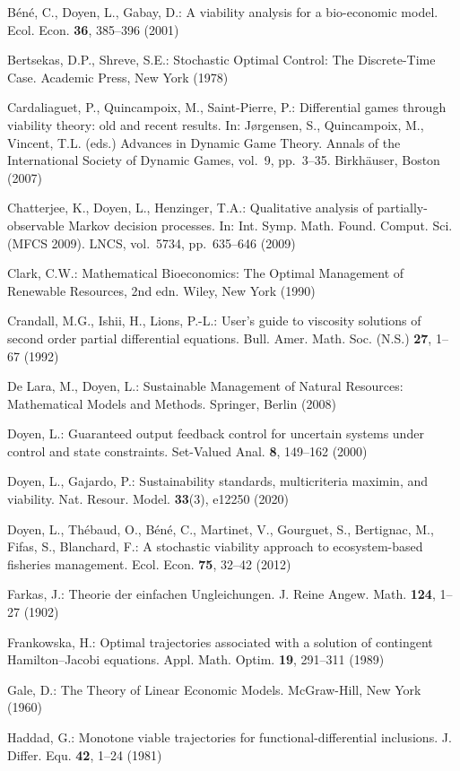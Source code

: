 \documentclass[10pt,twocolumn]{article}
\theoremstyle{definition}
\begin{document}
{B\'en\'e, C., Doyen, L., Gabay, D.: A viability analysis for a bio-economic
model. Ecol. Econ. \textbf{36}, 385--396 (2001)

Bertsekas, D.P., Shreve, S.E.: Stochastic Optimal Control: The
Discrete-Time Case. Academic Press, New York (1978)

Cardaliaguet, P., Quincampoix, M., Saint-Pierre, P.: Differential games
through viability theory: old and recent results. In: J\o{}rgensen, S.,
Quincampoix, M., Vincent, T.L. (eds.) Advances in Dynamic Game Theory.
Annals of the International Society of Dynamic Games, vol.~9, pp.~3--35.
Birkh\"auser, Boston (2007)

Chatterjee, K., Doyen, L., Henzinger, T.A.: Qualitative analysis
of partially-observable Markov decision processes. In: Int. Symp.
Math. Found. Comput. Sci. (MFCS 2009). LNCS, vol.~5734, pp.~635--646
(2009)

Clark, C.W.: Mathematical Bioeconomics: The Optimal Management of Renewable Resources, 2nd edn. Wiley, New York (1990)

Crandall, M.G., Ishii, H., Lions, P.-L.: User's guide to viscosity solutions of second order partial differential equations. Bull. Amer. Math. Soc. (N.S.) \textbf{27}, 1--67 (1992)

De Lara, M., Doyen, L.: Sustainable Management of Natural Resources:
Mathematical Models and Methods. Springer, Berlin (2008)

Doyen, L.: Guaranteed output feedback control for uncertain systems under control and state constraints. Set-Valued Anal. \textbf{8}, 149--162 (2000)

Doyen, L., Gajardo, P.: Sustainability standards, multicriteria maximin,
and viability. Nat. Resour. Model. \textbf{33}(3), e12250 (2020)

Doyen, L., Th\'ebaud, O., B\'en\'e, C., Martinet, V., Gourguet, S., Bertignac,
M., Fifas, S., Blanchard, F.: A stochastic viability approach to
ecosystem-based fisheries management. Ecol. Econ. \textbf{75}, 32--42
(2012)

Farkas, J.: Theorie der einfachen Ungleichungen. J. Reine Angew. Math.
\textbf{124}, 1--27 (1902)

Frankowska, H.: Optimal trajectories associated with a solution of
contingent Hamilton--Jacobi equations. Appl. Math. Optim. \textbf{19},
291--311 (1989)

Gale, D.: The Theory of Linear Economic Models. McGraw-Hill, New York
(1960)

Haddad, G.: Monotone viable trajectories for functional-differential
inclusions. J. Differ. Equ. \textbf{42}, 1--24 (1981)

}
\end{document}

